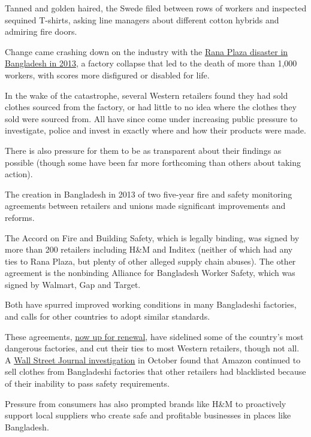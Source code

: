 Tanned and golden haired, the Swede filed between rows of workers and
inspected sequined T-shirts, asking line managers about different cotton
hybrids and admiring fire doors.

Change came crashing down on the industry with the
\href{https://www.nytimes.com/2015/06/02/world/asia/bangladesh-rana-plaza-murder-charges.html}{Rana
Plaza disaster in Bangladesh in 2013}, a factory collapse that led to
the death of more than 1,000 workers, with scores more disfigured or
disabled for life.

In the wake of the catastrophe, several Western retailers found they had
sold clothes sourced from the factory, or had little to no idea where
the clothes they sold were sourced from. All have since come under
increasing public pressure to investigate, police and invest in exactly
where and how their products were made.

There is also pressure for them to be as transparent about their
findings as possible (though some have been far more forthcoming than
others about taking action).

The creation in Bangladesh in 2013 of two five-year fire and safety
monitoring agreements between retailers and unions made significant
improvements and reforms.

The Accord on Fire and Building Safety, which is legally binding, was
signed by more than 200 retailers including H\&M and Inditex (neither of
which had any ties to Rana Plaza, but plenty of other alleged supply
chain abuses). The other agreement is the nonbinding Alliance for
Bangladesh Worker Safety, which was signed by Walmart, Gap and Target.

Both have spurred improved working conditions in many Bangladeshi
factories, and calls for other countries to adopt similar standards.

These agreements,
\href{https://cleanclothes.org/news/2019/questions-raised-after-agreement-reached-on-bangladesh-accord}{now
up for renewal}, have sidelined some of the country's most dangerous
factories, and cut their ties to most Western retailers, though not all.
A
\href{https://www.wsj.com/video/unsafe-factories-in-bangladesh-are-supplying-amazon-sellers/120C9E33-4C91-43D9-AE28-47B42DF47405.html}{Wall
Street Journal investigation} in October found that Amazon continued to
sell clothes from Bangladeshi factories that other retailers had
blacklisted because of their inability to pass safety requirements.

Pressure from consumers has also prompted brands like H\&M to
proactively support local suppliers who create safe and profitable
businesses in places like Bangladesh.

